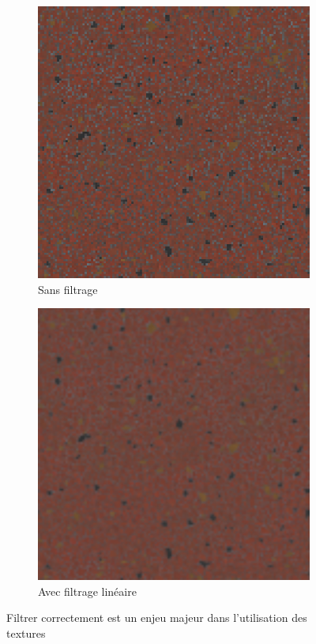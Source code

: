 \bigskip

\begin{figure}
    \centering
    \begin{subfigure}[b]{.45\textwidth}
        \includegraphics[width=\textwidth]{contenu/resources/images/porcelain_no_filter}
        \caption{Sans filtrage}
    \end{subfigure}
    \hfill
    \begin{subfigure}[b]{.45\textwidth}
        \includegraphics[width=\textwidth]{contenu/resources/images/porcelain_filter}
        \caption{Avec filtrage linéaire}
    \end{subfigure}
    \caption{Filtrer correctement est un enjeu majeur dans l'utilisation des textures}
    \label{fig:filtering}
\end{figure}

